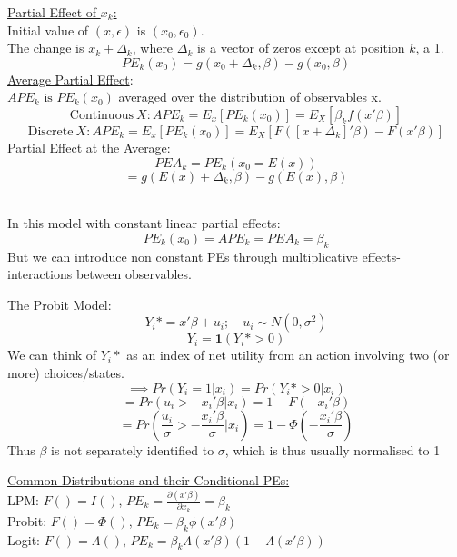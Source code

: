 \documentclass[DIV=14,titlepage=false]{scrreprt}
\begin{document}
\begin{definition}
\underline{Partial Effect of \(x_k\):}\\
Initial value of \((x,\epsilon)\) is \((x_0,\epsilon_0)\).\\
The change is \(x_k + \Delta_k\), where \(\Delta_k\) is a vector of zeros except at position \(k\), a 1.\\
\[PE_k(x_0)=g(x_0+\Delta_k,\beta)-g(x_0,\beta)\]
\underline{Average Partial Effect}:\\
\(APE_k\text{ is }PE_k(x_0)\) averaged over the distribution of observables x.
\[\text{Continuous}\ X: APE_k=E_x[PE_k(x_0)]=E_X[\beta_kf(x'\beta)]\]
\[\text{Discrete}\ X: APE_k=E_x[PE_k(x_0)]=E_X[F([x+\Delta_k]'\beta)-F(x'\beta)]\]
\underline{Partial Effect at the Average}:\\
\[PEA_k=PE_k(x_0=E(x))\]
\[=g(E(x)+\Delta_k,\beta)-g(E(x),\beta)\]
\end{definition}
\vspace{5mm}
\begin{note}
    \underline{}\\
    In this model with constant linear partial effects:
    \[PE_k(x_0)=APE_k=PEA_k=\beta_k\]
    But we can introduce non constant PEs through multiplicative effects- interactions between observables.
\end{note}
\vspace{5mm}
\begin{definition}
    The Probit Model:
    \[Y_i*=x'\beta+u_i; \quad u_i \sim N(0,\sigma^2)\]
    \[Y_i=\textbf{1}(Y_i*>0)\]
    We can think of \(Y_i*\) as an index of net utility from an action involving two (or more) choices/states.\\
    \[\implies Pr(Y_i=1|x_i)=Pr(Y_i*>0|x_i)\]
    \[=Pr(u_i>-x_i'\beta|x_i)=1-F(-x_i'\beta)\]
    \[=Pr(\frac{u_i}{\sigma}>-\frac{x_i'\beta}{\sigma}|x_i)=1-\Phi(-\frac{x_i'\beta}{\sigma})\]
    Thus \(\beta\) is not separately identified to \(\sigma\), which is thus usually normalised to 1\\
\end{definition}
\vspace{5mm}
\begin{example}\underline{Common Distributions and their Conditional PEs:}\\
    LPM: \(F()=I()\), \(PE_k=\frac{\partial (x'\beta)}{\partial x_k}=\beta_k\)\\
    Probit: \(F()=\Phi()\), \(PE_k=\beta_k\phi(x'\beta)\)\\
    Logit: \(F()=\Lambda()\), \(PE_k=\beta_k\Lambda(x'\beta)(1-\Lambda(x'\beta))\)\\
\end{example}
\vspace{5mm}
\end{document}
